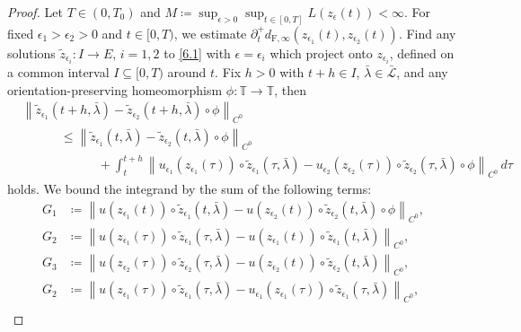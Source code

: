 \documentclass[reqno,centertags,12pt]{amsart}
\theoremstyle{definition}
\numberwithin{equation}{section}
\newcommand{\norm}[1]{\left\|#1\right\|}
\newcommand{\bbT}{{\mathbb{T}}}
\begin{document}
\begin{proof}
    Let $T\in(0,T_{0})$ and
    $M\coloneqq \sup_{\epsilon>0}\sup_{t\in[0,T]}L(z_{\epsilon}(t)) < \infty$.
    For fixed $\epsilon_{1}>\epsilon_{2}>0$ and $t\in[0,T)$, we estimate
    $\partial_{t}^{+}d_{\mathrm{F},\infty}(z_{\epsilon_{1}}(t),z_{\epsilon_{2}}(t))$.
    Find any solutions $\tilde{z}_{\epsilon_{i}}\colon I\to E$, $i=1,2$
    to \eqref{6.1} with $\epsilon=\epsilon_{i}$
    which project onto $z_{\epsilon_{i}}$, defined on a common interval $I\subseteq [0,T)$
    around $t$. Fix $h>0$ with $t+h\in I$, $\bar{\lambda}\in\bar{\mathcal{L}}$,
    and any orientation-preserving homeomorphism $\phi\colon\bbT\to\bbT$, then
    \begin{align*}
        &\norm{\tilde{z}_{\epsilon_{1}}(t+h,\bar{\lambda})
        - \tilde{z}_{\epsilon_{2}}(t+h,\bar{\lambda})\circ\phi}_{C^{0}}
        \\&\quad\quad\quad
        \leq \norm{\tilde{z}_{\epsilon_{1}}(t,\bar{\lambda})
        - \tilde{z}_{\epsilon_{2}}(t,\bar{\lambda})\circ\phi}_{C^{0}}
        \\&\quad\quad\quad\quad\quad\quad
        + \int_{t}^{t+h}
        \norm{u_{\epsilon_{1}}(z_{\epsilon_{1}}(\tau))
        \circ \tilde{z}_{\epsilon_{1}}(\tau,\bar{\lambda})
        - u_{\epsilon_{2}}(z_{\epsilon_{2}}(\tau))
        \circ \tilde{z}_{\epsilon_{2}}(\tau,\bar{\lambda})\circ\phi}_{C^{0}}\,d\tau
    \end{align*}
    holds. We bound the integrand by the sum of the following terms:
    \begin{align*}
        G_{1} &\coloneqq
        \norm{u(z_{\epsilon_{1}}(t))
        \circ \tilde{z}_{\epsilon_{1}}(t,\bar{\lambda})
        - u(z_{\epsilon_{2}}(t))
        \circ \tilde{z}_{\epsilon_{2}}(t,\bar{\lambda})\circ\phi}_{C^{0}}, \\
        G_{2} &\coloneqq
        \norm{u(z_{\epsilon_{1}}(\tau))
        \circ \tilde{z}_{\epsilon_{1}}(\tau,\bar{\lambda})
        - u(z_{\epsilon_{1}}(t))
        \circ \tilde{z}_{\epsilon_{1}}(t,\bar{\lambda})}_{C^{0}}, \\
        G_{3} &\coloneqq
        \norm{u(z_{\epsilon_{2}}(\tau))
        \circ \tilde{z}_{\epsilon_{2}}(\tau,\bar{\lambda})
        - u(z_{\epsilon_{2}}(t))
        \circ \tilde{z}_{\epsilon_{2}}(t,\bar{\lambda})}_{C^{0}}, \\
        G_{2} &\coloneqq
        \norm{u(z_{\epsilon_{1}}(\tau))
        \circ \tilde{z}_{\epsilon_{1}}(\tau,\bar{\lambda})
        - u_{\epsilon_{1}}(z_{\epsilon_{1}}(\tau))
        \circ \tilde{z}_{\epsilon_{1}}(\tau,\bar{\lambda})}_{C^{0}}, \\

\end{align*}
\end{proof}
\end{document}

